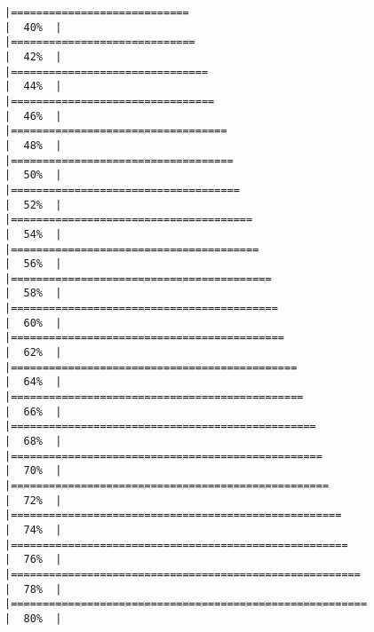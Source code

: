 \documentclass[
]{article}
\begin{document}
\begin{verbatim}
|============================                                          |  40%  |                                                                              |=============================                                         |  42%  |                                                                              |===============================                                       |  44%  |                                                                              |================================                                      |  46%  |                                                                              |==================================                                    |  48%  |                                                                              |===================================                                   |  50%  |                                                                              |====================================                                  |  52%  |                                                                              |======================================                                |  54%  |                                                                              |=======================================                               |  56%  |                                                                              |=========================================                             |  58%  |                                                                              |==========================================                            |  60%  |                                                                              |===========================================                           |  62%  |                                                                              |=============================================                         |  64%  |                                                                              |==============================================                        |  66%  |                                                                              |================================================                      |  68%  |                                                                              |=================================================                     |  70%  |                                                                              |==================================================                    |  72%  |                                                                              |====================================================                  |  74%  |                                                                              |=====================================================                 |  76%  |                                                                              |=======================================================               |  78%  |                                                                              |========================================================              |  80%  |                                                                              
\end{verbatim}
\end{document}
